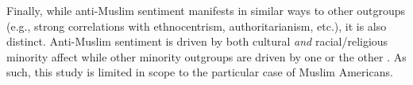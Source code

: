 Finally, while anti-Muslim sentiment manifests in similar ways to other outgroups (e.g., strong correlations with ethnocentrism, authoritarianism, etc.), it is also distinct. Anti-Muslim sentiment is driven by both cultural {\it and} racial/religious minority affect while other minority outgroups are driven by one or the other \citep{doi:10.1017/S0022381609090756}. As such, this study is limited in scope to the particular case of Muslim Americans.


